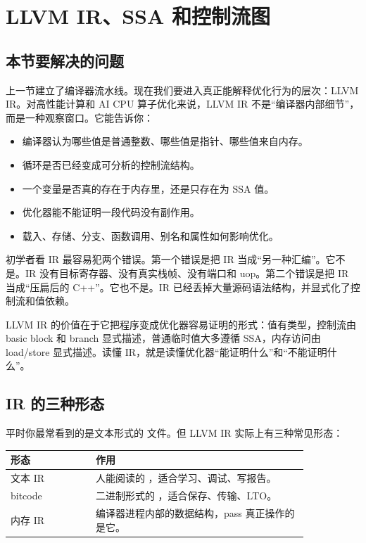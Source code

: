 \section{LLVM IR、SSA 和控制流图}

\subsection{本节要解决的问题}

上一节建立了编译器流水线。现在我们要进入真正能解释优化行为的层次：LLVM IR。对高性能计算和 AI CPU 算子优化来说，LLVM IR 不是“编译器内部细节”，而是一种观察窗口。它能告诉你：

\begin{itemize}
  \item 编译器认为哪些值是普通整数、哪些值是指针、哪些值来自内存。
  \item 循环是否已经变成可分析的控制流结构。
  \item 一个变量是否真的存在于内存里，还是只存在为 SSA 值。
  \item 优化器能不能证明一段代码没有副作用。
  \item 载入、存储、分支、函数调用、别名和属性如何影响优化。
\end{itemize}

初学者看 IR 最容易犯两个错误。第一个错误是把 IR 当成“另一种汇编”。它不是。IR 没有目标寄存器、没有真实栈帧、没有端口和 uop。第二个错误是把 IR 当成“压扁后的 C++”。它也不是。IR 已经丢掉大量源码语法结构，并显式化了控制流和值依赖。

\begin{keyidea}
LLVM IR 的价值在于它把程序变成优化器容易证明的形式：值有类型，控制流由 basic block 和 branch 显式描述，普通临时值大多遵循 SSA，内存访问由 load/store 显式描述。读懂 IR，就是读懂优化器“能证明什么”和“不能证明什么”。
\end{keyidea}

\subsection{IR 的三种形态}

平时你最常看到的是文本形式的  文件。但 LLVM IR 实际上有三种常见形态：

\begin{center}
\begin{tabular}{L{0.24\linewidth}L{0.60\linewidth}}
\toprule
形态 & 作用 \\
\midrule
文本 IR & 人能阅读的 ，适合学习、调试、写报告。 \\
bitcode & 二进制形式的 ，适合保存、传输、LTO。 \\
内存 IR & 编译器进程内部的数据结构，pass 真正操作的是它。 \\
\bottomrule
\end{tabular}
\end{center}

